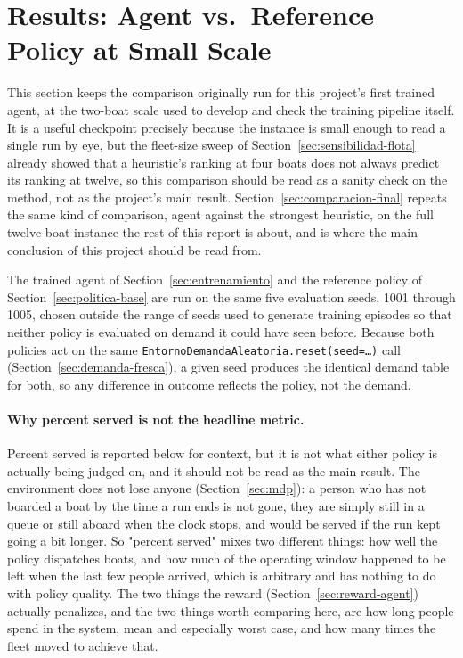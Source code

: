 \documentclass[11pt,a4paper]{article}
\begin{document}
\section{Results: Agent vs.\ Reference Policy at Small Scale}
\label{sec:comparacion}

This section keeps the comparison originally run for this project's first trained agent, at the two-boat scale used to develop and check the training pipeline itself. It is a useful checkpoint precisely because the instance is small enough to read a single run by eye, but the fleet-size sweep of Section~\ref{sec:sensibilidad-flota} already showed that a heuristic's ranking at four boats does not always predict its ranking at twelve, so this comparison should be read as a sanity check on the method, not as the project's main result. Section~\ref{sec:comparacion-final} repeats the same kind of comparison, agent against the strongest heuristic, on the full twelve-boat instance the rest of this report is about, and is where the main conclusion of this project should be read from.

The trained agent of Section~\ref{sec:entrenamiento} and the reference policy of Section~\ref{sec:politica-base} are run on the same five evaluation seeds, 1001 through 1005, chosen outside the range of seeds used to generate training episodes so that neither policy is evaluated on demand it could have seen before. Because both policies act on the same \texttt{EntornoDemandaAleatoria.reset(seed=\ldots)} call (Section~\ref{sec:demanda-fresca}), a given seed produces the identical demand table for both, so any difference in outcome reflects the policy, not the demand.

\paragraph{Why percent served is not the headline metric.} Percent served is reported below for context, but it is not what either policy is actually being judged on, and it should not be read as the main result. The environment does not lose anyone (Section~\ref{sec:mdp}): a person who has not boarded a boat by the time a run ends is not gone, they are simply still in a queue or still aboard when the clock stops, and would be served if the run kept going a bit longer. So "percent served" mixes two different things: how well the policy dispatches boats, and how much of the operating window happened to be left when the last few people arrived, which is arbitrary and has nothing to do with policy quality. The two things the reward (Section~\ref{sec:reward-agent}) actually penalizes, and the two things worth comparing here, are how long people spend in the system, mean and especially worst case, and how many times the fleet moved to achieve that.
\end{document}
